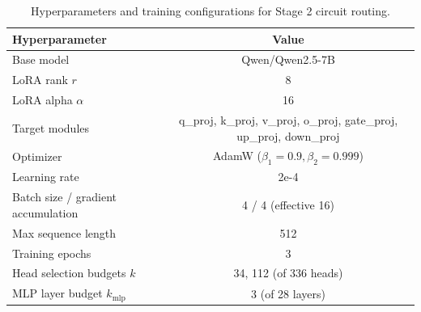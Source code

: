\begin{table}[t]
\centering
\small
\begin{tabular}{lc}
\toprule
\textbf{Hyperparameter} & \textbf{Value} \\
\midrule
Base model & Qwen/Qwen2.5-7B \\
LoRA rank $r$ & 8 \\
LoRA alpha $\alpha$ & 16 \\
Target modules & q\_proj, k\_proj, v\_proj, o\_proj, gate\_proj, up\_proj, down\_proj \\
Optimizer & AdamW ($\beta_1=0.9, \beta_2=0.999$) \\
Learning rate & 2e-4 \\
Batch size / gradient accumulation & 4 / 4 (effective 16) \\
Max sequence length & 512 \\
Training epochs & 3 \\
Head selection budgets $k$ & 34, 112 (of 336 heads) \\
MLP layer budget $k_{\text{mlp}}$ & 3 (of 28 layers) \\
\bottomrule
\end{tabular}
\caption{Hyperparameters and training configurations for Stage 2 circuit routing.}
\label{tab:hparams}
\end{table}
